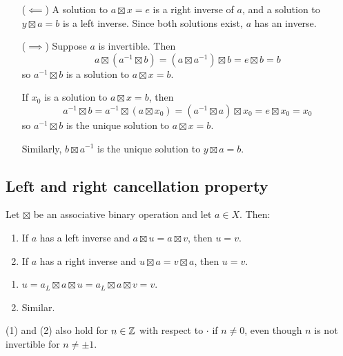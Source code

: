 \documentclass[12pt,letterpaper]{report}
\begin{document}
\begin{thmproof}
  \begin{itemize}[leftmargin=4em]
    \item[($\impliedby$)]
    A solution to $a \boxtimes x = e$ is a right inverse of $a$, and a solution to
    $y \boxtimes a = b$ is a left inverse.
    Since both solutions exist, $a$ has an inverse.
    \item[($\implies$)]
    Suppose $a$ is invertible.
    Then
    \[ a \boxtimes (a^{-1} \boxtimes b) = (a \boxtimes a^{-1}) \boxtimes b = e \boxtimes b = b \]
    so $a^{-1} \boxtimes b$ is a solution to $a \boxtimes x = b$.

    If $x_0$ is a solution to $a \boxtimes x = b$, then
    \[
      a^{-1} \boxtimes b = a^{-1} \boxtimes (a \boxtimes x_0) = (a^{-1} \boxtimes a) \boxtimes x_0
        = e \boxtimes x_0 = x_0
    \]
    so $a^{-1} \boxtimes b$ is the unique solution to $a \boxtimes x = b$.

    Similarly, $b \boxtimes a^{-1}$ is the unique solution to $y \boxtimes a = b$.
  \end{itemize}
\end{thmproof}

\pagebreak
\subsection{Left and right cancellation property}

\begin{prop}{}{}
  Let $\boxtimes$ be an associative binary operation and let $a \in X$.
  Then:
  \begin{enumerate}
    \item If $a$ has a left inverse and $a \boxtimes u = a \boxtimes v$, then $u = v$.
    \item If $a$ has a right inverse and $u \boxtimes a = v \boxtimes a$, then $u = v$.
  \end{enumerate}
\end{prop}

\begin{thmproof}
  \begin{enumerate}
    \item $u = a_L \boxtimes a \boxtimes u = a_L \boxtimes a \boxtimes v = v$.
    \item Similar.
  \end{enumerate}
\end{thmproof}

(1) and (2) also hold for $n \in \mathbb{Z}$ with respect to $\cdot$ if $n \neq 0$, even though $n$
is not invertible for $n \neq \pm 1$.
\end{document}
